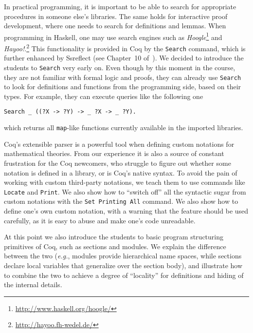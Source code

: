 \documentclass[blockstyle,preprint]{sigplanconf}
\newcommand{\is}[1]{\textcolor{blue}{(Ilya: {#1})}}
\newcommand{\an}[1]{\textcolor{red}{(Aleks: {#1})}}
\newcommand{\code}[1]{\lstinline{#1}}
\newcommand{\eg}{\emph{e.g.}\xspace}
\begin{document}
In practical programming, it is important to be able to search for
appropriate procedures in someone else's libraries. The same holds for
interactive proof development, where one needs to search for
definitions and lemmas. When programming in Haskell, one may use
search engines such as
\emph{Hoogle}\footnote{\footnotesize{\url{http://www.haskell.org/hoogle/}}}
and
\emph{Hayoo!}.\footnote{\footnotesize{\url{http://hayoo.fh-wedel.de/}}}
This functionality is provided in Coq by the \code{Search} command,
which is further enhanced by Ssreflect (see Chapter~10
of~\cite{Gonthier-al:TR}). We decided to introduce the students to
\code{Search} very early on. Even though by this moment in the course,
they are not familiar with formal logic and proofs, they can already
use \code{Search} to look for definitions and functions from the
programming side, based on their types. For example, they can execute
queries like the following one
%
%
\begin{lstlisting}
Search _ ((?X -> ?Y) -> _ ?X -> _ ?Y).
\end{lstlisting}
%
%
which returns all \code{map}-like functions currently available in
the imported libraries.  

Coq's extensible parser is a powerful tool when defining custom
notations for mathematical theories. From our experience it is also a
source of constant frustration for the Coq newcomers, who struggle to
figure out whether some notation is defined in a library, or is Coq's
native syntax. To avoid the pain of working with custom third-party
notations, we teach them to use commands like \code{Locate} and
\code{Print}. We also show how to ``switch off'' all the syntactic
sugar from custom notations with the \code{Set Printing All}
command. We also show how to define one's own custom notation, with a
warning that the feature should be used carefully, as it is easy to
abuse and make one's code unreadable.

At this point we also introduce the students to basic program
structuring primitives of Coq, such as sections and modules. We
explain the difference between the two (\eg, modules provide
hierarchical name spaces, while sections declare local variables that
generalize over the section body), and illustrate how to combine the
two to achieve a degree of ``locality'' for definitions and hiding of
the internal details.
%
\end{document}
